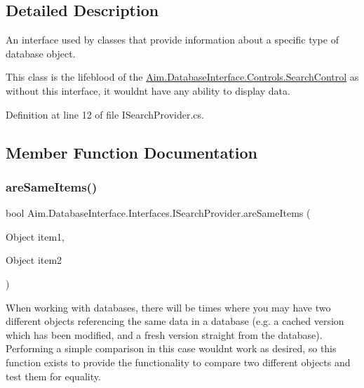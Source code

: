 \subsection{Detailed Description}
An interface used by classes that provide information about a specific type of database object. 

This class is the lifeblood of the \mbox{\hyperlink{class_aim_1_1_database_interface_1_1_controls_1_1_search_control}{Aim.\+Database\+Interface.\+Controls.\+Search\+Control}} as without this interface, it wouldn\textquotesingle{}t have any ability to display data. 

Definition at line 12 of file I\+Search\+Provider.\+cs.



\subsection{Member Function Documentation}
\mbox{\label{interface_aim_1_1_database_interface_1_1_interfaces_1_1_i_search_provider_a608a2be47f59cbd951c8003111b18df3}} 
\subsubsection{\texorpdfstring{are\+Same\+Items()}{areSameItems()}}
{\footnotesize\ttfamily bool Aim.\+Database\+Interface.\+Interfaces.\+I\+Search\+Provider.\+are\+Same\+Items (\begin{DoxyParamCaption}\item[{Object}]{item1,  }\item[{Object}]{item2 }\end{DoxyParamCaption})}



When working with databases, there will be times where you may have two different objects referencing the same data in a database (e.\+g. a cached version which has been modified, and a fresh version straight from the database). Performing a simple comparison in this case wouldn\textquotesingle{}t work as desired, so this function exists to provide the functionality to compare two different objects and test them for equality. 

